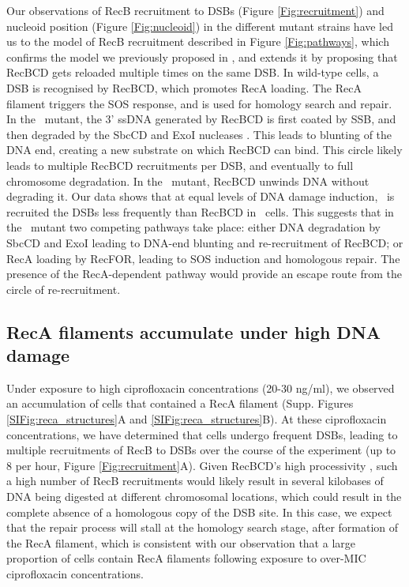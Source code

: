 Our observations of RecB recruitment to DSBs (Figure \ref{Fig:recruitment}) and nucleoid position (Figure \ref{Fig:nucleoid}) in the different mutant strains have led us to the model of RecB recruitment described in Figure \ref{Fig:pathways}, which confirms the model we previously proposed in \cite{Lepore2023}, and extends it by proposing that RecBCD gets reloaded multiple times on the same DSB. In wild-type cells, a DSB is recognised by RecBCD, which promotes RecA loading. The RecA filament triggers the SOS response, and is used for homology search and repair. In the \dreca\ mutant, the 3' ssDNA generated by RecBCD is first coated by SSB, and then degraded by the SbcCD and ExoI nucleases \cite{Zahradka2009}. This leads to blunting of the DNA end, creating a new substrate on which RecBCD can bind. This circle likely leads to multiple RecBCD recruitments per DSB, and eventually to full chromosome degradation. In the \geneteneighty\ mutant, RecBCD unwinds DNA without degrading it. Our data shows that at equal levels of DNA damage induction, \teneighty\ is recruited the DSBs less frequently than RecBCD in \dreca\ cells. This suggests that in the \geneteneighty\ mutant two competing pathways take place: either DNA degradation by SbcCD and ExoI leading to DNA-end blunting and re-recruitment of RecBCD; or RecA loading by RecFOR, leading to SOS induction and homologous repair. The presence of the RecA-dependent pathway would provide an escape route from the circle of re-recruitment.

\subsection*{RecA filaments accumulate under high DNA damage}
Under exposure to high ciprofloxacin concentrations (20-30 ng/ml), we observed an accumulation of cells that contained a RecA filament (Supp. Figures \ref{SIFig:reca_structures}A and \ref{SIFig:reca_structures}B). At these ciprofloxacin concentrations, we have determined that cells undergo frequent DSBs, leading to multiple recruitments of RecB to DSBs over the course of the experiment (up to 8 per hour, Figure \ref{Fig:recruitment}A). Given RecBCD's high processivity \cite{Wiktor2018}, such a high number of RecB recruitments would likely result in several kilobases of DNA being digested at different chromosomal locations, which could result in the complete absence of a homologous copy of the DSB site. In this case, we expect that the repair process will stall at the homology search stage, after formation of the RecA filament, which is consistent with our observation that a large proportion of cells contain RecA filaments following exposure to over-MIC ciprofloxacin concentrations.

